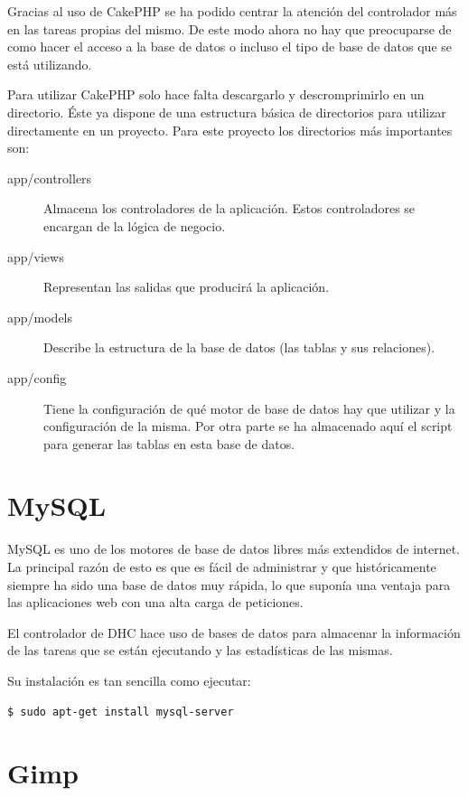 Gracias al uso de CakePHP se ha podido centrar la atención del controlador más en las tareas propias del mismo. De este modo ahora no hay que preocuparse de como hacer el acceso a la base de datos o incluso el tipo de base de datos que se está utilizando.

Para utilizar CakePHP solo hace falta descargarlo y descromprimirlo en un directorio. Éste ya dispone de una estructura básica de directorios para utilizar directamente en un proyecto. Para este proyecto los directorios más importantes son:

\begin{description}
	\item[app/controllers] Almacena los controladores de la aplicación. Estos controladores se encargan de la lógica de negocio.
	
	\item[app/views] Representan las salidas que producirá la aplicación.
	
	\item[app/models] Describe la estructura de la base de datos (las tablas y sus relaciones).

	\item[app/config] Tiene la configuración de qué motor de base de datos hay que utilizar y la configuración de la misma. Por otra parte se ha almacenado aquí el script para generar las tablas en esta base de datos.
\end{description}

\section{MySQL}

MySQL es uno de los motores de base de datos libres más extendidos de internet. La principal razón de esto es que es fácil de administrar y que históricamente siempre ha sido una base de datos muy rápida, lo que suponía una ventaja para las aplicaciones web con una alta carga de peticiones.

El controlador de DHC hace uso de bases de datos para almacenar la información de las tareas que se están ejecutando y las estadísticas de las mismas.

Su instalación es tan sencilla como ejecutar:

\begin{verbatim}
$ sudo apt-get install mysql-server
\end{verbatim}

\section{Gimp}

